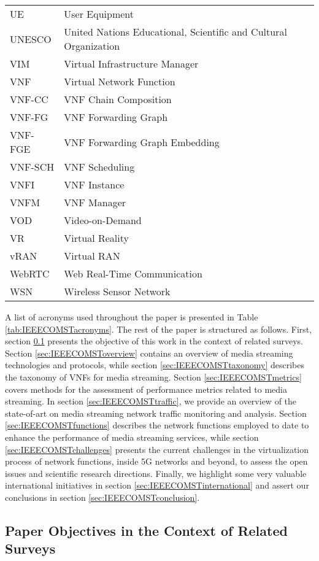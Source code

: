 \begin{longtable}{p{}p{}}
	UE & User Equipment \\
	UNESCO & United Nations Educational, Scientific and Cultural Organization \\
	VIM & Virtual Infrastructure Manager \\
	VNF & Virtual Network Function \\
	VNF-CC & VNF Chain Composition \\
	VNF-FG & VNF Forwarding Graph \\
	VNF-FGE & VNF Forwarding Graph Embedding \\
	VNF-SCH & VNF Scheduling \\
	VNFI & VNF Instance \\
	VNFM & VNF Manager \\
	VOD & Video-on-Demand \\
	VR & Virtual Reality \\
	vRAN & Virtual RAN \\
	WebRTC & Web Real-Time Communication \\
	WSN & Wireless Sensor Network \\
	\hline
\end{longtable}
	
	
A list of acronyms used throughout the paper is presented in Table \ref{tab:IEEECOMSTacronyms}.
The rest of the paper is structured as follows.
First, section \ref{sec:IEEECOMSTcompair} presents the objective of this work in the context of related surveys.
Section \ref{sec:IEEECOMSToverview} contains an overview of media streaming technologies and protocols, while section \ref{sec:IEEECOMSTtaxonomy} describes the taxonomy of VNFs for media streaming.
Section \ref{sec:IEEECOMSTmetrics} covers methods for the assessment of performance metrics related to media streaming.
In section \ref{sec:IEEECOMSTtraffic}, we provide an overview of the state-of-art on media streaming network traffic monitoring and analysis.
Section \ref{sec:IEEECOMSTfunctions} describes the network functions employed to date to enhance the performance of media streaming services, while section \ref{sec:IEEECOMSTchallenges} presents the current challenges in the virtualization process of network functions, inside 5G networks and beyond, to assess the open issues and scientific research directions.
Finally, we highlight some very valuable international initiatives in section \ref{sec:IEEECOMSTinternational} and assert our conclusions in section \ref{sec:IEEECOMSTconclusion}.
	
	
\subsection{Paper Objectives in the Context of Related Surveys}
\label{sec:IEEECOMSTcompair}

